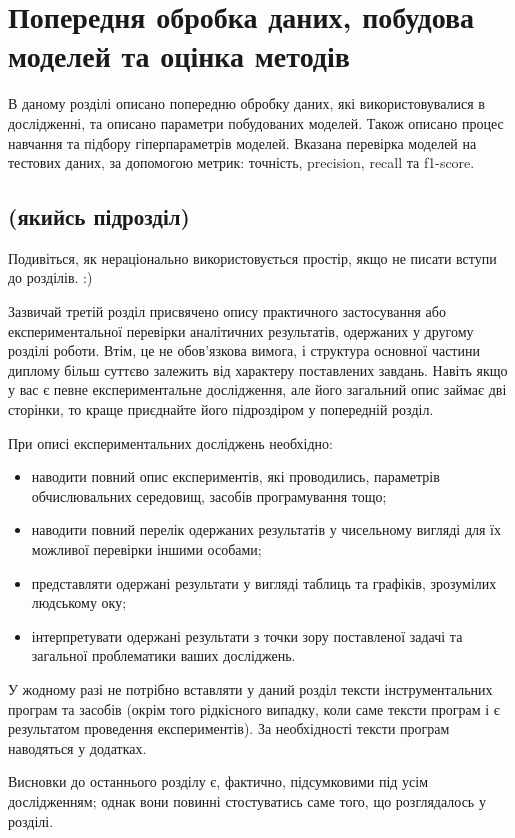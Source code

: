 \chapter{Попередня обробка даних, побудова моделей та оцінка методів}
\label{chap:practice}

В даному розділі описано попередню обробку даних, які використовувалися в дослідженні, та описано параметри побудованих моделей. Також описано процес навчання та підбору гіперпараметрів моделей. Вказана перевірка моделей на тестових даних, за допомогою метрик: точність, precision, recall та f1-score.

\section{(якийсь підрозділ)}

Подивіться, як нераціонально використовується простір, якщо не писати 
вступи до розділів. :)

Зазвичай третій розділ присвячено опису практичного застосування або 
експериментальної перевірки аналітичних результатів, одержаних у другому 
розділі роботи. Втім, це не обов'язкова вимога, і структура основної 
частини диплому більш суттєво залежить від характеру поставлених завдань. 
Навіть якщо у вас є певне експериментальне дослідження, але його загальний 
опис займає дві сторінки, то краще приєднайте його підроздіром у 
попередній розділ.

При описі експериментальних досліджень необхідно:

\begin{itemize}
\item наводити повний опис експериментів, які проводились, параметрів 
обчислювальних середовищ, засобів програмування тощо;
\item наводити повний перелік одержаних результатів у чисельному вигляді для їх можливої 
перевірки іншими особами;
\item представляти одержані результати у вигляді таблиць та графіків, 
зрозумілих людському оку;
\item інтерпретувати одержані результати з точки зору поставленої задачі 
та загальної проблематики ваших досліджень.
\end{itemize}

У жодному разі не потрібно вставляти у даний розділ тексти 
інструментальних програм та засобів (окрім того рідкісного випадку, коли 
саме тексти програм і є результатом проведення експериментів). За 
необхідності тексти програм наводяться у додатках.


\chapconclude{\ref{chap:practice}}

Висновки до останнього розділу є, фактично, підсумковими під усім 
дослідженням; однак вони повинні стостуватись саме того, що розглядалось у 
розділі.